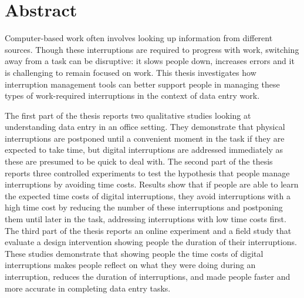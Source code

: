 \section*{Abstract}
Computer-based work often involves looking up information from different sources. Though these interruptions are required to progress with work, switching away from a task can be disruptive: it slows people down, increases errors and it is challenging to remain focused on work. This thesis investigates how interruption management tools can better support people in managing these types of work-required interruptions in the context of data entry work.

The first part of the thesis reports two qualitative studies looking at understanding data entry in an office setting. They demonstrate that physical interruptions are postponed until a convenient moment in the task if they are expected to take time, but digital interruptions are addressed immediately as these are presumed to be quick to deal with. The second part of the thesis reports three controlled experiments to test the hypothesis that people manage interruptions by avoiding time costs. Results show that if people are able to learn the expected time costs of digital interruptions, they avoid interruptions with a high time cost by reducing the number of these interruptions and postponing them until later in the task, addressing interruptions with low time costs first. The third part of the thesis reports an online experiment and a field study that evaluate a design intervention showing people the duration of their interruptions. These studies demonstrate that showing people the time costs of digital interruptions makes people reflect on what they were doing during an interruption, reduces the duration of interruptions, and made people faster and more accurate in completing data entry tasks.

